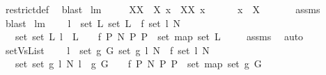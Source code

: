 \begin{isabellebody}
\ restrict{\isacharunderscore}def\ \isamarkupfalse%
\ blast%
\endisatagproof
{\isafoldproof}%
%
\isadelimproof
\isanewline
%
\endisadelimproof
\isanewline
\isanewline
{}\isamarkupfalse%
\ lm{}{}{}{\isacharcolon}\ \isanewline
\ \ \ {\isachardoublequoteopen}{\isasymUnion}\ XX\ {\isasymsubseteq}\ X{\isachardoublequoteclose}\ {\isachardoublequoteopen}x\ {\isasymin}\ XX{\isachardoublequoteclose}\ {\isachardoublequoteopen}x\ {\isasymnoteq}\ {\isacharbraceleft}{\isacharbraceright}{\isachardoublequoteclose}\ \isanewline
\ \ \ {\isachardoublequoteopen}x\ {\isasyminter}\ X\ {\isasymnoteq}\ {\isacharbraceleft}{\isacharbraceright}{\isachardoublequoteclose}\ \isanewline
%
\isadelimproof
\ \ %
\endisadelimproof
%
\isatagproof
{}\isamarkupfalse%
\ assms\ \isamarkupfalse%
\ blast%
\endisatagproof
{\isafoldproof}%
%
\isadelimproof
\isanewline
%
\endisadelimproof
\isanewline
\isanewline
{}\isamarkupfalse%
\ lm{}{}{}{\isacharcolon}\ \isanewline
\ \ \ {\isachardoublequoteopen}{\isasymforall}l\ {\isasymin}\ set\ L{}{\isachardot}\ set\ L{}\ {\isacharequal}\ f{}\ {\isacharparenleft}set\ l{\isacharparenright}\ N{\isachardoublequoteclose}\ \isanewline
\ \ \ {\isachardoublequoteopen}set\ {\isacharbrackleft}set\ L{}{\isachardot}\ l\ {\isacharless}{\isacharminus}\ L{}{\isacharbrackright}\ \ {\isacharequal}\ \ {\isacharbraceleft}f{}\ P\ N{\isacharbar}\ P{\isachardot}\ P\ {\isasymin}\ set\ {\isacharparenleft}map\ set\ L{}{\isacharparenright}{\isacharbraceright}{\isachardoublequoteclose}\ \isanewline
%
\isadelimproof
\ \ %
\endisadelimproof
%
\isatagproof
{}\isamarkupfalse%
\ assms\ \isamarkupfalse%
\ auto%
\endisatagproof
{\isafoldproof}%
%
\isadelimproof
\isanewline
%
\endisadelimproof
\isanewline
\isanewline
{}\isamarkupfalse%
\ setVsList{\isacharcolon}\ \isanewline
\ \ \ {\isachardoublequoteopen}{\isasymforall}l\ {\isasymin}\ set\ {\isacharparenleft}g{}\ G{\isacharparenright}{\isachardot}\ set\ {\isacharparenleft}g{}\ l\ N{\isacharparenright}\ {\isacharequal}\ f{}\ {\isacharparenleft}set\ l{\isacharparenright}\ N{\isachardoublequoteclose}\ \isanewline
\ \ \ {\isachardoublequoteopen}set\ {\isacharbrackleft}set\ {\isacharparenleft}g{}\ l\ N{\isacharparenright}{\isachardot}\ l\ {\isacharless}{\isacharminus}\ {\isacharparenleft}g{}\ G{\isacharparenright}{\isacharbrackright}\ \ {\isacharequal}\ \ {\isacharbraceleft}f{}\ P\ N{\isacharbar}\ P{\isachardot}\ P\ {\isasymin}\ set\ {\isacharparenleft}map\ set\ {\isacharparenleft}g{}\ G{\isacharparenright}{\isacharparenright}{\isacharbraceright}{\isachardoublequoteclose}\ \isanewline

\end{isabellebody}
